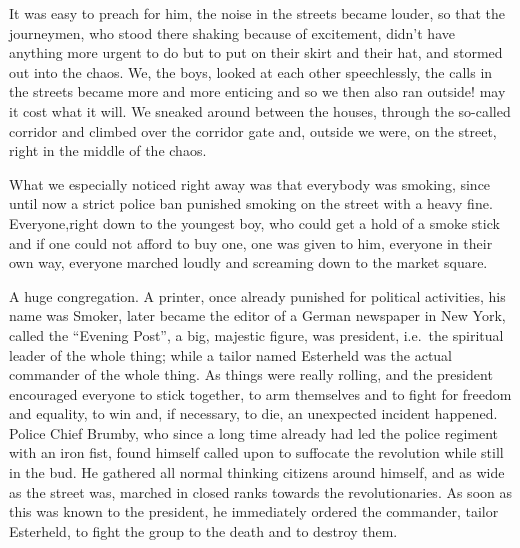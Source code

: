 It was easy to preach for him, the noise in the streets became louder, so that the journeymen, who stood there shaking because of excitement, didn't have anything more urgent to do but to put on their skirt and their hat, and stormed out into the chaos. We, the boys, looked at each other speechlessly, the calls in the streets became more and more enticing and so we then also ran outside! may it cost what it will. We sneaked around between the houses, through the so-called corridor and climbed over the corridor gate and, outside we were, on the street, right in the middle of the chaos.

What we especially noticed right away was that everybody was smoking, since until now a strict police ban punished smoking on the street with a heavy fine. Everyone,right down to the youngest boy, who could get a hold of a smoke stick and if one could not afford to buy one, one was given to him, everyone in their own way, everyone marched loudly and screaming down to the market square.

A huge congregation. A printer, once already punished for political activities, his name was Smoker, later became the editor of a German newspaper in New York, called the ``Evening Post'', a big, majestic figure, was president, i.e.~the spiritual leader of the whole thing; while a tailor named Esterheld was the actual commander of the whole thing. As things were really rolling, and the president encouraged everyone to stick together, to arm themselves and to fight for freedom and equality, to win and, if necessary, to die, an unexpected incident happened. Police Chief Brumby, who since a long time already had led the police regiment with an iron fist, found himself called upon to suffocate the revolution while still in the bud. He gathered all normal thinking citizens around himself, and as wide as the street was, marched in closed ranks towards the revolutionaries. As soon as this was known to the president, he immediately ordered the commander, tailor Esterheld, to fight the group to the death and to destroy them.

